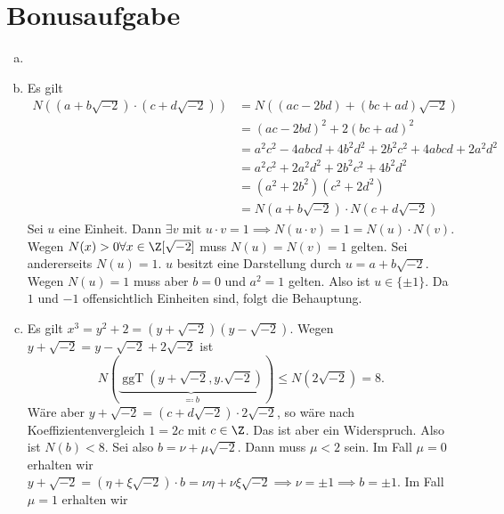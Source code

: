 \documentclass{article}
\begin{document}
    \section*{Bonusaufgabe}
    \begin{enumerate}[(a)]
        \item {}
        \item Es gilt
        \begin{align*}
            N((a + b\sqrt{-2}) \cdot (c + d\sqrt{-2})) &= N((ac - 2bd) + (bc + ad)\sqrt{-2})\\
            &= (ac - 2bd)^2 + 2 (bc + ad)^2\\
            &= a^2c^2 - 4abcd + 4b^2d^2 + 2b^2c^2 + 4abcd + 2a^2d^2\\
            &= a^2c^2 + 2a^2d^2 + 2b^2c^2 + 4b^2d^2\\
            &= (a^2 + 2b^2)(c^2 + 2d^2)\\
            &= N(a + b\sqrt{-2}) \cdot N(c + d \sqrt{-2})
        \end{align*}
        Sei $u$ eine Einheit. Dann $\exists v$ mit $u\cdot v = 1 \implies N(u\cdot v) = 1 = N(u)\cdot N(v)$. Wegen $N(x) > 0 \forall x \in \Z[\sqrt{-2}]$ muss $N(u) = N(v) = 1$ gelten. Sei andererseits $N(u) = 1$. $u$ besitzt eine Darstellung durch $u = a + b\sqrt{-2}$. Wegen $N(u) = 1$ muss aber $b = 0$ und $a^2 = 1$ gelten. Also ist $u \in \{\pm 1\}$. Da $1$ und $-1$ offensichtlich Einheiten sind, folgt die Behauptung.
        \item Es gilt $x^3 = y^2 + 2 = (y + \sqrt{-2})(y - \sqrt{-2})$. Wegen $y + \sqrt{-2} = y - \sqrt{-2} + 2\sqrt{-2}$ ist $$N(\underbrace{\operatorname{ggT}(y + \sqrt{-2}, y . \sqrt{-2})}_{\eqqcolon b}) \leq N(2\sqrt{-2}) = 8.$$ Wäre aber $y + \sqrt{-2} = (c + d\sqrt{-2}) \cdot 2 \sqrt{-2}$, so wäre nach Koeffizientenvergleich $1 = 2c$ mit $c\in \Z$. Das ist aber ein Widerspruch. Also ist $N(b) < 8$. Sei also $b = \nu + \mu \sqrt{-2}$. Dann muss $\mu <2$ sein. Im Fall $\mu = 0$ erhalten wir $y + \sqrt{-2} = (\eta + \xi \sqrt{-2})\cdot b = \nu \eta + \nu \xi \sqrt{-2} \implies \nu = \pm 1 \implies b = \pm 1$. Im Fall $\mu = 1$ erhalten wir 
    \end{enumerate}
\end{document}
